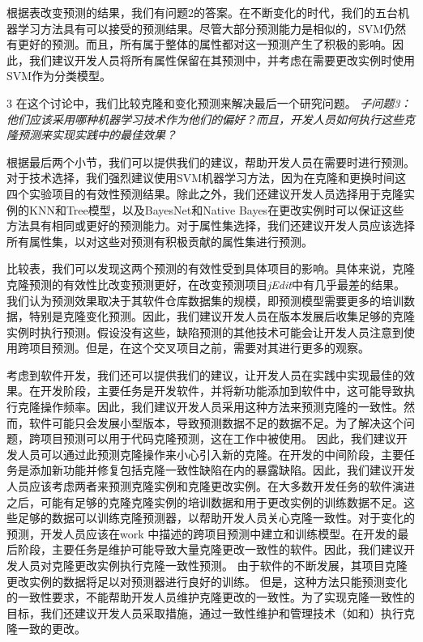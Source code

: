 {根据表改变预测的结果，我们有问题2的答案。在不断变化的时代，我们的五台机器学习方法具有可以接受的预测结果。尽管大部分预测能力是相似的，SVM仍然有更好的预测。而且，所有属于整体的属性都对这一预测产生了积极的影响。因此，我们建议开发人员将所有属性保留在其预测中，并考虑在需要更改实例时使用SVM作为分类模型。


{3}
在这个讨论中，我们比较克隆和变化预测来解决最后一个研究问题。
{\em {子问题3：}
他们应该采用哪种机器学习技术作为他们的偏好？而且，开发人员如何执行这些克隆预测来实现实践中的最佳效果？
}

根据最后两个小节，我们可以提供我们的建议，帮助开发人员在需要时进行预测。
对于技术选择，我们强烈建议使用SVM机器学习方法，因为在克隆和更换时间这四个实验项目的有效性预测结果。除此之外，我们还建议开发人员选择用于克隆实例的KNN和Tree模型，以及BayesNet和Native Bayes在更改实例时可以保证这些方法具有相同或更好的预测能力。对于属性集选择，我们还建议开发人员应该选择所有属性集，以对这些对预测有积极贡献的属性集进行预测。%

比较表，我们可以发现这两个预测的有效性受到具体项目的影响。具体来说，克隆克隆预测的有效性比改变预测更好，在改变预测项目{\em jEdit}中有几乎最差的结果。我们认为预测效果取决于其软件仓库数据集的规模，即预测模型需要更多的培训数据，特别是克隆变化预测。因此，我们建议开发人员在版本发展后收集足够的克隆实例时执行预测。假设没有这些，缺陷预测的其他技术可能会让开发人员注意到使用跨项目预测。但是，在这个交叉项目之前，需要对其进行更多的观察。


考虑到软件开发，我们还可以提供我们的建议，让开发人员在实践中实现最佳的效果。在开发阶段，主要任务是开发软件，并将新功能添加到软件中，这可能导致执行克隆操作频率。因此，我们建议开发人员采用这种方法来预测克隆的一致性。然而，软件可能只会发展小型版本，导致预测数据不足的数据不足。为了解决这个问题，跨项目预测可以用于代码克隆预测，这在工作中被使用\cite{wang2014predicting}。
因此，我们建议开发人员可以通过此预测克隆操作来小心引入新的克隆。在开发的中间阶段，主要任务是添加新功能并修复包括克隆一致性缺陷在内的暴露缺陷。因此，我们建议开发人员应该考虑两者来预测克隆实例和克隆更改实例。在大多数开发任务的软件演进之后，可能有足够的克隆克隆实例的培训数据和用于更改实例的训练数据不足。这些足够的数据可以训练克隆预测器，以帮助开发人员关心克隆一致性。对于变化的预测，开发人员应该在work \cite{zhang2016predicting}中描述的跨项目预测中建立和训练模型。在开发的最后阶段，主要任务是维护可能导致大量克隆更改一致性的软件。因此，我们建议开发人员对克隆更改实例执行克隆一致性预测。
由于软件的不断发展，其项目克隆更改实例的数据将足以对预测器进行良好的训练。
但是，这种方法只能预测变化的一致性要求，不能帮助开发人员维护克隆更改的一致性。为了实现克隆一致性的目标，我们还建议开发人员采取措施，通过一致性维护和管理技术（如\cite{cheng2016rule}和\cite{nguyen2012clone}）执行克隆一致的更改。

}
